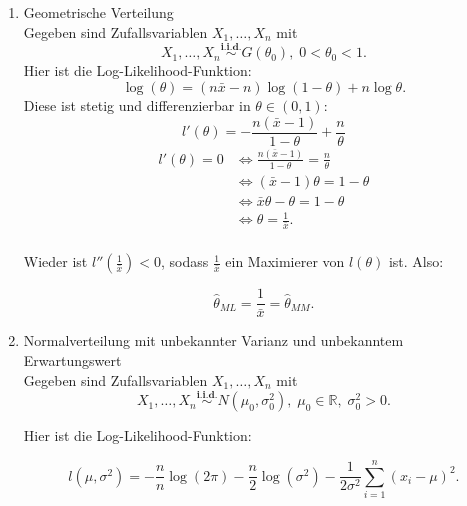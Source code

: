 \documentclass[10pt]{article}
\newcommand{\FZV}{X_1, \ldots, X_n} %
\newcommand{\IR}{\mathbb{R}} %
\newenvironment{BSP}[1][]
{\begin{Beispiel}[frametitle=#1]}{\end{Beispiel}}
\begin{document}
\begin{BSP}[Maximum-Likelihood]
\begin{enumerate}[label = (\roman*)]
			
			\item Geometrische Verteilung \\
			Gegeben sind Zufallsvariablen $\FZV$ mit
			\begin{equation*}
				\FZV \overset{\textbf{i.i.d.}}{\sim} G(\theta_0), \; 0 < \theta_0 < 1.
			\end{equation*} 
			Hier ist die Log-Likelihood-Funktion: 
			\begin{equation*}
				\log(\theta)= (n\bar{x}-n)\log(1-\theta)+ n\log\theta.
			\end{equation*}
			Diese ist stetig und differenzierbar in $\theta \in (0,1)$:
			\begin{equation*}
				l'(\theta) = - \frac{n(\bar{x}-1)}{1-\theta} + \frac{n}{\theta}
			\end{equation*}
			\begin{equation*}
				\begin{split}
					l'(\theta) = 0 &\Leftrightarrow \frac{n (\bar{x}-1)}{1-\theta} = \frac{n}{\theta}\\
					&\Leftrightarrow (\bar{x}-1) \theta = 1-\theta\\
					&\Leftrightarrow \bar{x} \theta - \theta = 1-\theta\\
					&\Leftrightarrow \theta = \frac{1}{\bar{x}}.\\
				\end{split}
			\end{equation*}
			
			Wieder ist $l''(\frac{1}{\bar{x}}) <0$, sodass $\frac{1}{\bar{x}}$ ein Maximierer von $l(\theta)$ ist. Also:
			
			\begin{equation*}
				\hat{\theta}_{ML} = \frac{1}{\bar{x}} = \hat{\theta}_{MM}.
			\end{equation*} 
			
			\item Normalverteilung mit unbekannter Varianz und unbekanntem Erwartungswert\\
			Gegeben sind Zufallsvariablen $\FZV$ mit
			\begin{equation*}
				\FZV \overset{\textbf{i.i.d.}} {\sim} N(\mu_0,\sigma_0^2),\; \mu_0 \in \IR, \; \sigma_0^2 >0. 
			\end{equation*}
			
			Hier ist die Log-Likelihood-Funktion:
			
			\begin{equation*}
				l(\mu, \sigma^2) = -\frac{n}{n}\log(2\pi) - \frac{n}{2}\log(\sigma^2)-\frac{1}{2\sigma^2}\sum_{i=1}^{n}(x_i-\mu)^2.
			\end{equation*}
			

\end{enumerate}
\end{BSP}
\end{document}
